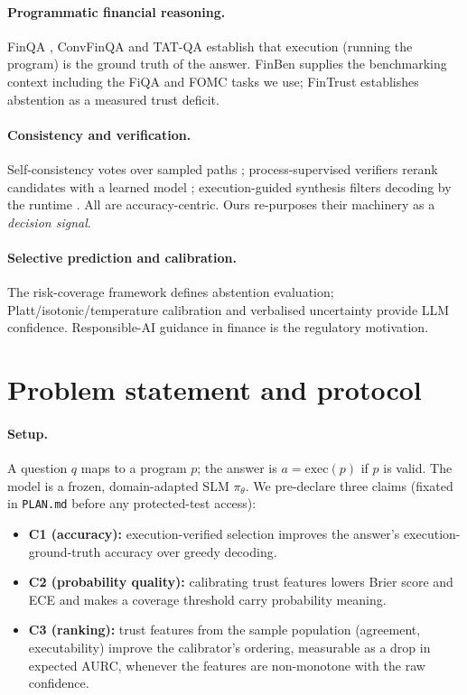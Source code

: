 \documentclass[10pt]{article}
\begin{document}
\paragraph{Programmatic financial reasoning.}
FinQA \citep{chen2021finqa}, ConvFinQA \citep{chen2022convfinqa} and TAT-QA
\citep{zhu2021tatqa} establish that execution (running the program) is the ground truth of
the answer. FinBen \citep{xie2024finben} supplies the benchmarking context including the
FiQA and FOMC tasks we use; FinTrust \citep{hu2025fintrust} establishes abstention as a
measured trust deficit.

\paragraph{Consistency and verification.}
Self-consistency votes over sampled paths \citep{wang2023selfconsistency}; process-supervised
verifiers rerank candidates with a learned model \citep{lightman2024verify,wang2024mathshepherd};
execution-guided synthesis filters decoding by the runtime \citep{chen2019execution}.
All are accuracy-centric. Ours re-purposes their machinery as a \emph{decision signal}.

\paragraph{Selective prediction and calibration.}
The risk-coverage framework \citep{eliyaniv2010selective,geifman2017selective,geifman2019selectivenet}
defines abstention evaluation; Platt/isotonic/temperature calibration
\citep{platt1999platt,zadrozny2002isotonic,guo2017calibration} and verbalised uncertainty
\citep{lin2022uncertainty} provide LLM confidence. Responsible-AI guidance in finance
\citep{fritzmorgenthal2022risk} is the regulatory motivation.

\section{Problem statement and protocol}
\paragraph{Setup.} A question $q$ maps to a program $p$; the answer is $a=\text{exec}(p)$
if $p$ is valid. The model is a frozen, domain-adapted SLM $\pi_{\theta}$. We pre-declare
three claims (fixated in \texttt{PLAN.md} before any protected-test access):
\begin{itemize}[nosep,leftmargin=1.2em]
\item \textbf{C1 (accuracy):} execution-verified selection improves the answer's
execution-ground-truth accuracy over greedy decoding.
\item \textbf{C2 (probability quality):} calibrating trust features lowers Brier score and
ECE and makes a coverage threshold carry probability meaning.
\item \textbf{C3 (ranking):} trust features from the sample population (agreement,
executability) improve the calibrator's ordering, measurable as a drop in expected AURC,
whenever the features are non-monotone with the raw confidence.
\end{itemize}
\end{document}
